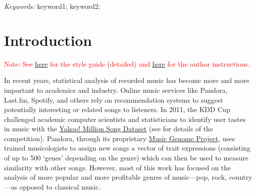 \documentclass[12pt]{article}
\def\spacingset#1{\renewcommand{\baselinestretch}%
{#1}\small\normalsize} \spacingset{1}
\newcommand{\attn}[1]{\textcolor{red}{Note: #1}}
\begin{document}
\noindent%
{\it Keywords:}  keyword1; keyword2; 
\vfill


\spacingset{1.45} %

\tableofcontents










\section{Introduction}
\label{sec:introduction}

\attn{See \href {http://amstat.tfjournals.com/asa-style-guide/}{here}
  for the style guide (detailed) and
  \href{https://www.tandfonline.com/action/authorSubmission?journalCode=uasa20&page=instructions}{here}
  for the author instructions.}

In recent years, statistical analysis of recorded music has
become more and more important to academics and industry. Online
music services like Pandora, Last.fm, Spotify, and others rely on
recommendation systems to suggest potentially interesting or related
songs to listeners. In 2011, the KDD Cup challenged academic computer
scientists and statisticians to identify user tastes in music with the
\href{http://labrosa.ee.columbia.edu/millionsong/}{Yahoo! Million
  Song Dataset} (see \citet{DrorKoenigstein2012} for details of the
competition). Pandora, through its proprietary
\href{https://www.pandora.com/about/mgp}{Music Genome Project}, uses
trained musicologists to assign new songs a vector of trait
expressions (consisting of up to 500 `genes' depending on the genre)
which can then be used to measure similarity with other
songs. However, most of this work has focused on the analysis of more popular
and more profitable genres of music---pop, rock, country---as opposed
to classical music. 
\end{document}
